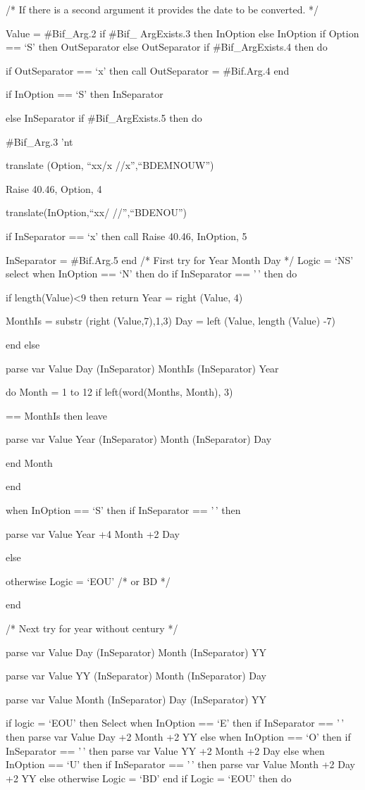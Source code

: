 /* If there is a second argument it provides the date to be converted.
*/

Value = \#Bif\_Arg.2 if \#Bif\_ ArgExists.3 then InOption else InOption
if Option == `S' then OutSeparator else OutSeparator if
\#Bif\_ArgExists.4 then do

if OutSeparator == `x' then call OutSeparator = \#Bif.Arg.4 end

if InOption == `S' then InSeparator

else InSeparator if \#Bif\_ArgExists.5 then do

\#Bif\_Arg.3 'nt

translate (Option, ``xx/x //x'',``BDEMNOUW'')

Raise 40.46, Option, 4

translate(InOption,``xx/ //'',``BDENOU'')

if InSeparator == `x' then call Raise 40.46, InOption, 5

InSeparator = \#Bif.Arg.5 end /* First try for Year Month Day */ Logic =
`NS' select when InOption == `N' then do if InSeparator == '\,' then do

if length(Value)\textless9 then return Year = right (Value, 4)

MonthIs = substr (right (Value,7),1,3) Day = left (Value, length (Value)
-7)

end else

parse var Value Day (InSeparator) MonthIs (InSeparator) Year

do Month = 1 to 12 if left(word(Months, Month), 3)

== MonthIs then leave

parse var Value Year (InSeparator) Month (InSeparator) Day

end Month

end

when InOption == `S' then if InSeparator == '\,' then

parse var Value Year +4 Month +2 Day

else

otherwise Logic = `EOU' /* or BD */

end

/* Next try for year without century */

parse var Value Day (InSeparator) Month (InSeparator) YY

parse var Value YY (InSeparator) Month (InSeparator) Day

parse var Value Month (InSeparator) Day (InSeparator) YY

if logic = `EOU' then Select when InOption == `E' then if InSeparator ==
'\,' then parse var Value Day +2 Month +2 YY else when InOption == `O'
then if InSeparator == '\,' then parse var Value YY +2 Month +2 Day else
when InOption == `U' then if InSeparator == '\,' then parse var Value
Month +2 Day +2 YY else otherwise Logic = `BD' end if Logic = `EOU' then
do

